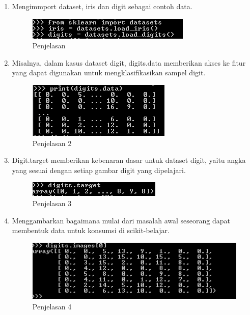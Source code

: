 \begin{enumerate}
\item Mengimmport dataset, iris dan digit sebagai contoh data.
\begin{figure}
	\begin{center}
   	 \includegraphics[scale=0.5]{figures/penjelasan1.png}
   	 \caption{Penjelasan }	
	\end{center}
\end{figure}

\item Misalnya, dalam kasus dataset digit, digits.data memberikan akses ke fitur yang dapat digunakan untuk mengklasifikasikan sampel digit.
\begin{figure}
	\begin{center}
   	 \includegraphics[scale=0.5]{figures/penjelasan2.png}
   	 \caption{Penjelasan 2}	
	\end{center}
\end{figure}

\item Digit.target memberikan kebenaran dasar untuk dataset digit, yaitu angka yang sesuai dengan setiap gambar digit yang dipelajari.
\begin{figure}
	\begin{center}
   	 \includegraphics[scale=0.5]{figures/penjelasan3.png}
   	 \caption{Penjelasan 3}	
	\end{center}
\end{figure}

\item Menggambarkan bagaimana mulai dari masalah awal seseorang dapat membentuk data untuk konsumsi di scikit-belajar.
\begin{figure}
	\begin{center}
   	 \includegraphics[scale=0.5]{figures/penjelasan4.png}
   	 \caption{Penjelasan 4}	
	\end{center}
\end{figure}

\end{enumerate}

